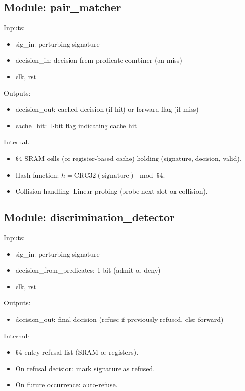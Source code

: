 \documentclass[11pt,oneside]{article}
\begin{document}
\subsection{Module: pair\_matcher}

Inputs:
\begin{itemize}
\item sig\_in: perturbing signature
\item decision\_in: decision from predicate combiner (on miss)
\item clk, rst
\end{itemize}

Outputs:
\begin{itemize}
\item decision\_out: cached decision (if hit) or forward flag (if miss)
\item cache\_hit: 1-bit flag indicating cache hit
\end{itemize}

Internal:
\begin{itemize}
\item 64 SRAM cells (or register-based cache) holding (signature, decision, valid).
\item Hash function: $h = \text{CRC32}(\text{signature}) \mod 64$.
\item Collision handling: Linear probing (probe next slot on collision).
\end{itemize}

\subsection{Module: discrimination\_detector}

Inputs:
\begin{itemize}
\item sig\_in: perturbing signature
\item decision\_from\_predicates: 1-bit (admit or deny)
\item clk, rst
\end{itemize}

Outputs:
\begin{itemize}
\item decision\_out: final decision (refuse if previously refused, else forward)
\end{itemize}

Internal:
\begin{itemize}
\item 64-entry refusal list (SRAM or registers).
\item On refusal decision: mark signature as refused.
\item On future occurrence: auto-refuse.
\end{itemize}
\end{document}
